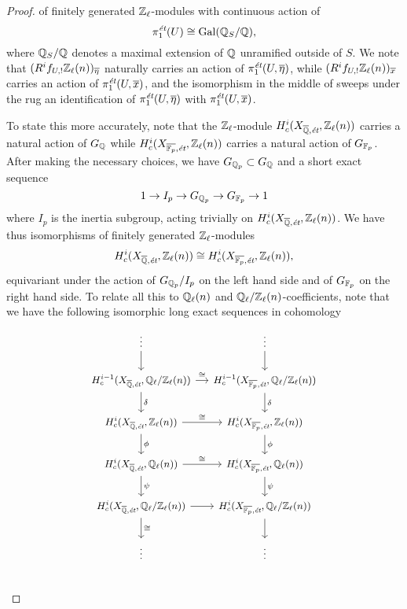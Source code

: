 \begin{proposition}
\begin{proof}
    \noindent of finitely generated $\mathbb{Z}_\ell$-modules with continuous action of
    $$\pi_1^\text{\it ét} (U) \cong \operatorname{Gal} (\mathbb{Q}_S/\mathbb{Q}),$$
    where $\mathbb{Q}_S/\mathbb{Q}$ denotes a maximal extension of $\mathbb{Q}$ unramified outside of
    $S$. We note that $(R^i f_{U,!} \mathbb{Z}_\ell (n))_{\overline{\eta}}$ naturally
    carries an action of $\pi_1^\text{\it ét} (U, \overline{\eta})$, while
    $(R^i f_{U,!} \mathbb{Z}_\ell (n))_{\overline{x}}$ carries an action of
    $\pi_1^\text{\it ét} (U, \overline{x})$, and the isomorphism in the middle
    of  sweeps under the rug an identification
    of $\pi_1^\text{\it ét} (U, \overline{\eta})$ with
    $\pi_1^\text{\it ét} (U, \overline{x})$.

    To state this more accurately, note that the $\mathbb{Z}_\ell$-module
    $H^i_c (X_{\overline{\mathbb{Q}}, \text{\it ét}}, \mathbb{Z}_\ell (n))$ carries a natural
    action of $G_{\mathbb{Q}}$ while
    $H^i_c (X_{\overline{\mathbb{F}_p}, \text{\it ét}}, \mathbb{Z}_\ell (n))$ carries a
    natural action of $G_{\mathbb{F}_p}$. After making the necessary choices, we have
    $G_{\mathbb{Q}_p} \subset G_{\mathbb{Q}}$ and a short exact sequence
    $$1 \to I_p \to G_{\mathbb{Q}_p} \to G_{\mathbb{F}_p} \to 1$$
    where $I_p$ is the inertia subgroup, acting trivially on
    $H^i_c (X_{\overline{\mathbb{Q}}, \text{\it ét}}, \mathbb{Z}_\ell (n))$. We have thus
    isomorphisms of finitely generated $\mathbb{Z}_\ell$-modules
    \[ H^i_c (X_{\overline{\mathbb{Q}}, \text{\it ét}}, \mathbb{Z}_\ell (n)) \cong
      H^i_c (X_{\overline{\mathbb{F}_p}, \text{\it ét}}, \mathbb{Z}_\ell (n)), \]
    equivariant under the action of $G_{\mathbb{Q}_p}/I_p$ on the left hand side and of
    $G_{\mathbb{F}_p}$ on the right hand side. To relate all this to $\mathbb{Q}_\ell (n)$ and
    $\mathbb{Q}_\ell/\mathbb{Z}_\ell (n)$-coefficients, note that we have the following
    isomorphic long exact sequences in cohomology
    \begin{equation}
      \label{eqn:Zl-Ql-Ql/Zl-les}
      \begin{tikzcd}[column sep=small, font=\small]
        \vdots \ar{d} & \vdots \ar{d} \\
        H_c^{i-1} (X_{\overline{\QQ},\text{\it ét}}, \QQ_\ell/\ZZ_\ell (n)) \ar{d}{\delta}\ar{r}{\isom} & H_c^{i-1} (X_{\overline{\FF_p},\text{\it ét}}, \QQ_\ell/\ZZ_\ell (n))  \ar{d}{\delta} \\
        H_c^i (X_{\overline{\QQ},\text{\it ét}}, \ZZ_\ell (n)) \ar{d}{\phi}\ar{r}{\isom} & H_c^i (X_{\overline{\FF_p},\text{\it ét}}, \ZZ_\ell (n)) \ar{d}{\phi} \\
        H_c^i (X_{\overline{\QQ},\text{\it ét}}, \QQ_\ell (n)) \ar{d}{\psi}\ar{r}{\isom} & H_c^i (X_{\overline{\FF_p},\text{\it ét}}, \QQ_\ell (n)) \ar{d}{\psi} \\
        H_c^i (X_{\overline{\QQ},\text{\it ét}}, \QQ_\ell/\ZZ_\ell (n)) \ar{r}\ar{d}{\isom} & H_c^i (X_{\overline{\FF_p},\text{\it ét}}, \QQ_\ell/\ZZ_\ell (n)) \ar{d} \\
        \vdots & \vdots \\
      \end{tikzcd}
    \end{equation}


\end{proof}
\end{proposition}
